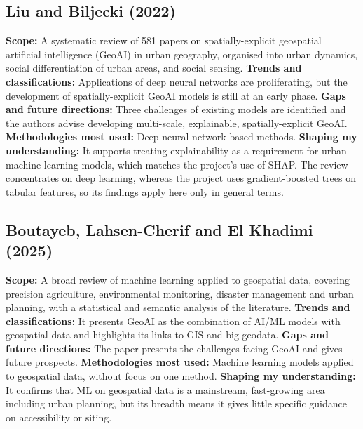 \documentclass[pdflatex,sn-mathphys-num]{sn-jnl}
\begin{document}
\subsection{Liu and Biljecki (2022) \cite{liu2022}}
\textbf{Scope:} A systematic review of 581 papers on spatially-explicit geospatial artificial intelligence (GeoAI) in urban geography, organised into urban dynamics, social differentiation of urban areas, and social sensing.
\textbf{Trends and classifications:} Applications of deep neural networks are proliferating, but the development of spatially-explicit GeoAI models is still at an early phase.
\textbf{Gaps and future directions:} Three challenges of existing models are identified and the authors advise developing multi-scale, explainable, spatially-explicit GeoAI.
\textbf{Methodologies most used:} Deep neural network-based methods.
\textbf{Shaping my understanding:} It supports treating explainability as a requirement for urban machine-learning models, which matches the project's use of SHAP. The review concentrates on deep learning, whereas the project uses gradient-boosted trees on tabular features, so its findings apply here only in general terms.

\subsection{Boutayeb, Lahsen-Cherif and El Khadimi (2025) \cite{boutayeb2025}}
\textbf{Scope:} A broad review of machine learning applied to geospatial data, covering precision agriculture, environmental monitoring, disaster management and urban planning, with a statistical and semantic analysis of the literature.
\textbf{Trends and classifications:} It presents GeoAI as the combination of AI/ML models with geospatial data and highlights its links to GIS and big geodata.
\textbf{Gaps and future directions:} The paper presents the challenges facing GeoAI and gives future prospects.
\textbf{Methodologies most used:} Machine learning models applied to geospatial data, without focus on one method.
\textbf{Shaping my understanding:} It confirms that ML on geospatial data is a mainstream, fast-growing area including urban planning, but its breadth means it gives little specific guidance on accessibility or siting.
\end{document}
